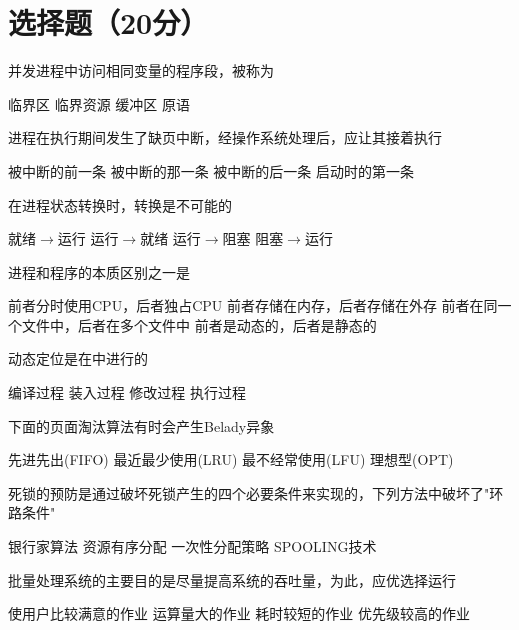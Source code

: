 \documentclass{exam}
\newif\ifprint
\newcommand{\blank}[2][1cm]{\uline{\makebox[#1][c]{%
			\ifprint
			\phantom{#2}%
			\else
			#2%
			\fi}}}
\begin{document}
\section{选择题（20分）}
	\begin{questions}
		\question[2]并发进程中访问相同变量的程序段，被称为\blank{}
		\begin{choices}
			\choice 临界区
			\choice 临界资源
			\choice 缓冲区
			\choice 原语
		\end{choices}
		
		\question[2]进程在执行期间发生了缺页中断，经操作系统处理后，应让其接着执行\blank{}
		\begin{choices}
			\choice 被中断的前一条
			\choice 被中断的那一条
			\choice 被中断的后一条
			\choice 启动时的第一条
		\end{choices}
		
		\question[2]在进程状态转换时，\blank{}转换是不可能的
		\begin{choices}
			\choice 就绪$\to$运行
			\choice 运行$\to$就绪
			\choice 运行$\to$阻塞
			\choice 阻塞$\to$运行
		\end{choices}
		
		\question[2]进程和程序的本质区别之一是\blank{}
		\begin{choices}
			\choice 前者分时使用CPU，后者独占CPU
			\choice 前者存储在内存，后者存储在外存
			\choice 前者在同一个文件中，后者在多个文件中
			\choice 前者是动态的，后者是静态的
		\end{choices}
		
		\question[2]动态定位是在\blank{}中进行的
		\begin{choices}
			\choice 编译过程
			\choice 装入过程
			\choice 修改过程
			\choice 执行过程
		\end{choices}
		
		\question[2]下面的\blank{}页面淘汰算法有时会产生Belady异象
		\begin{choices}
			\choice 先进先出(FIFO)
			\choice 最近最少使用(LRU)
			\choice 最不经常使用(LFU)
			\choice 理想型(OPT)
		\end{choices}
		
		\question[2]死锁的预防是通过破坏死锁产生的四个必要条件来实现的，下列方法中\blank{}破坏了"环路条件"
		\begin{choices}
			\choice 银行家算法
			\choice 资源有序分配
			\choice 一次性分配策略
			\choice SPOOLING技术
		\end{choices}
		
		\question[2]批量处理系统的主要目的是尽量提高系统的吞吐量，为此，应优选择\blank{}运行
		\begin{choices}
			\choice 使用户比较满意的作业
			\choice 运算量大的作业
			\choice 耗时较短的作业
			\choice 优先级较高的作业
		\end{choices}
		

\end{questions}
\end{document}
